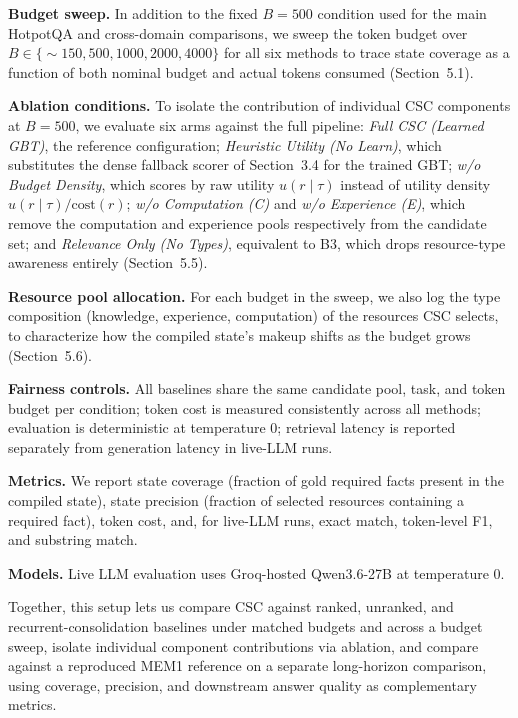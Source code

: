 \documentclass{article}
\begin{document}
\textbf{Budget sweep.} In addition to the fixed $B=500$ condition used for the main HotpotQA and cross-domain comparisons, we sweep the token budget over $B \in \{\sim\!150, 500, 1000, 2000, 4000\}$ for all six methods to trace state coverage as a function of both nominal budget and actual tokens consumed (Section~5.1).

\textbf{Ablation conditions.} To isolate the contribution of individual CSC components at $B=500$, we evaluate six arms against the full pipeline: \textit{Full CSC (Learned GBT)}, the reference configuration; \textit{Heuristic Utility (No Learn)}, which substitutes the dense fallback scorer of Section~3.4 for the trained GBT; \textit{w/o Budget Density}, which scores by raw utility $u(r\mid\tau)$ instead of utility density $u(r\mid\tau)/\text{cost}(r)$; \textit{w/o Computation (C)} and \textit{w/o Experience (E)}, which remove the computation and experience pools respectively from the candidate set; and \textit{Relevance Only (No Types)}, equivalent to B3, which drops resource-type awareness entirely (Section~5.5).

\textbf{Resource pool allocation.} For each budget in the sweep, we also log the type composition (knowledge, experience, computation) of the resources CSC selects, to characterize how the compiled state's makeup shifts as the budget grows (Section~5.6).

\textbf{Fairness controls.} All baselines share the same candidate pool, task, and token budget per condition; token cost is measured consistently across all methods; evaluation is deterministic at temperature 0; retrieval latency is reported separately from generation latency in live-LLM runs.

\textbf{Metrics.} We report state coverage (fraction of gold required facts present in the compiled state), state precision (fraction of selected resources containing a required fact), token cost, and, for live-LLM runs, exact match, token-level F1, and substring match.

\textbf{Models.} Live LLM evaluation uses Groq-hosted Qwen3.6-27B at temperature 0.

Together, this setup lets us compare CSC against ranked, unranked, and recurrent-consolidation baselines under matched budgets and across a budget sweep, isolate individual component contributions via ablation, and compare against a reproduced MEM1 reference on a separate long-horizon comparison, using coverage, precision, and downstream answer quality as complementary metrics.
\end{document}
